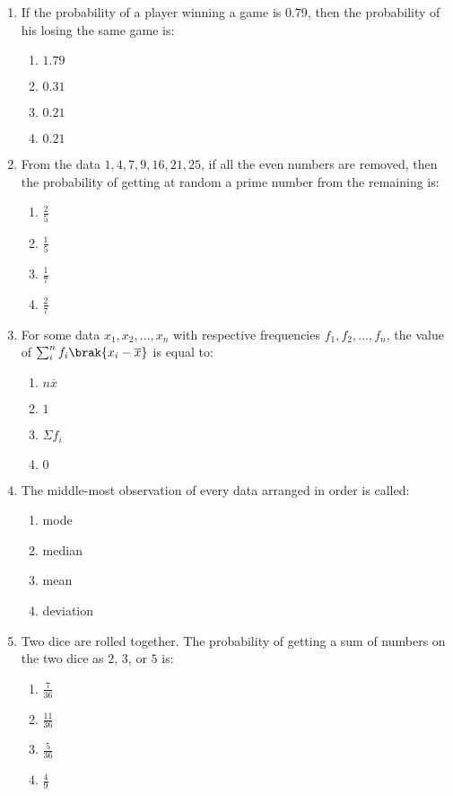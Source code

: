 
\begin{enumerate}

\item If the probability of a player winning a game is 0.79, then the probability of his losing the same game is:
\begin{enumerate}    
    \item $1.79$
    \item $0.31$
    \item $0.21	$                                                           
    \item $0.21$
\end{enumerate}

\item From the data $1, 4, 7, 9, 16, 21, 25$, if all the even numbers are removed, then the probability of getting at random a prime number from the remaining is:
	\begin{enumerate}
\item $\frac{2}{5}$
    \item $\frac{1}{5}$
    \item $\frac{1}{7}$
    \item $\frac{2}{7}$
	\end{enumerate}

\item For some data $x_{1}, x_{2}, \dots, x_{n}$ with respective frequencies $f_{1}, f_{2}, \dots, f_{n}$, the value of $\sum_{i}^{n}f_{i} \brak{x_{i} - \overline{x}}$ is equal to:
	\begin{enumerate}    
\item $n \overline{x}$
    \item $1$
    \item $\Sigma f_{i}$
    \item $0$
	\end{enumerate}

\item The middle-most observation of every data arranged in order is called:
	\begin{enumerate}    
\item mode
    \item median
    \item mean
    \item deviation
\end{enumerate}
\newpage
\item Two dice are rolled together. The probability of getting a sum of numbers on the two dice as $2$, $3$, or $5$ is:
	\begin{enumerate}    
\item $\frac{7}{36}$
    \item $\frac{11}{36}$
    \item $\frac{5}{36}$
    \item $\frac{4}{9}$
	\end{enumerate}
\end{enumerate}
